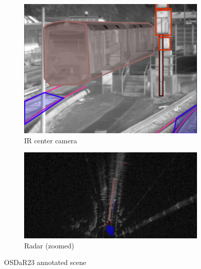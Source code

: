 \begin{figure}[H]
    \begin{subfigure}{0.45\textwidth}
        \centering
        \includegraphics[width=\textwidth]{PICs/OSDaR23_dataset/labeled_IR.png}
        \caption{IR center camera}
    \end{subfigure}%
    \hspace{0.05\textwidth}
    \begin{subfigure}{0.45\textwidth}
        \centering
        \includegraphics[width=\textwidth]{PICs/OSDaR23_dataset/labeled_Radar.png}
        \caption{Radar (zoomed)}
    \end{subfigure}
    
    \caption{OSDaR23 annotated scene \cite{oSDaR23}}
    \label{fig:OSDaR23_annotated}
\end{figure}



